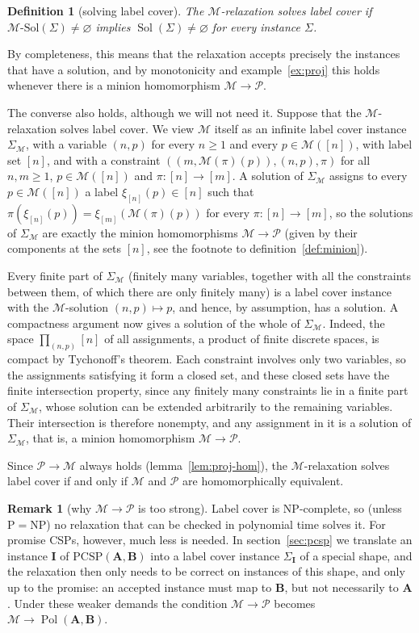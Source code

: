 \documentclass[11pt]{article}
\theoremstyle{plain}
\newtheorem{definition}[theorem]{Definition}
\theoremstyle{definition}
\newtheorem{remark}[theorem]{Remark}
\newcommand{\Pol}{\operatorname{Pol}}
\newcommand{\Sol}{\operatorname{Sol}}
\newcommand{\Solm}[1]{#1\text{-}\mathrm{Sol}}
\newcommand{\bA}{\mathbf{A}}
\newcommand{\bB}{\mathbf{B}}
\newcommand{\bI}{\mathbf{I}}
\newcommand{\Pm}{\mathscr{P}}
\newcommand{\M}{\mathscr{M}}
\newcommand{\PCSP}{\mathrm{PCSP}}
\begin{document}
\begin{definition}[solving label cover]
The $\M$-relaxation \emph{solves} label cover if $\Solm{\M}(\Sigma)\neq\varnothing$ implies $\Sol(\Sigma)\neq\varnothing$ for every instance $\Sigma$.
\end{definition}

By completeness, this means that the relaxation accepts precisely the instances that have a solution, and by monotonicity and example~\ref{ex:proj} this holds whenever there is a minion homomorphism $\M\to\Pm$.

The converse also holds, although we will not need it. Suppose that the $\M$-relaxation solves label cover. We view $\M$ itself as an infinite label cover instance $\Sigma_\M$, with a variable $(n,p)$ for every $n\geq1$ and every $p\in\M([n])$, with label set $[n]$, and with a constraint $((m,\M(\pi)(p)),(n,p),\pi)$ for all $n,m\geq1$, $p\in\M([n])$ and $\pi\colon[n]\to[m]$. A solution of $\Sigma_\M$ assigns to every $p\in\M([n])$ a label $\xi_{[n]}(p)\in[n]$ such that $\pi(\xi_{[n]}(p))=\xi_{[m]}(\M(\pi)(p))$ for every $\pi\colon[n]\to[m]$, so the solutions of $\Sigma_\M$ are exactly the minion homomorphisms $\M\to\Pm$ (given by their components at the sets $[n]$, see the footnote to definition~\ref{def:minion}).

Every finite part of $\Sigma_\M$ (finitely many variables, together with all the constraints between them, of which there are only finitely many) is a label cover instance with the $\M$-solution $(n,p)\mapsto p$, and hence, by assumption, has a solution. A compactness argument now gives a solution of the whole of $\Sigma_\M$. Indeed, the space $\prod_{(n,p)}[n]$ of all assignments, a product of finite discrete spaces, is compact by Tychonoff's theorem. Each constraint involves only two variables, so the assignments satisfying it form a closed set, and these closed sets have the finite intersection property, since any finitely many constraints lie in a finite part of $\Sigma_\M$, whose solution can be extended arbitrarily to the remaining variables. Their intersection is therefore nonempty, and any assignment in it is a solution of $\Sigma_\M$, that is, a minion homomorphism $\M\to\Pm$.

Since $\Pm\to\M$ always holds (lemma~\ref{lem:proj-hom}), the $\M$-relaxation solves label cover if and only if $\M$ and $\Pm$ are homomorphically equivalent.

\begin{remark}[why $\M\to\Pm$ is too strong]\label{rem:too-strong}
Label cover is NP-complete, so (unless $\mathrm P=\mathrm{NP}$) no relaxation that can be checked in polynomial time solves it. For promise CSPs, however, much less is needed. In section~\ref{sec:pcsp} we translate an instance $\bI$ of $\PCSP(\bA,\bB)$ into a label cover instance $\Sigma_{\bI}$ of a special shape, and the relaxation then only needs to be correct on instances of this shape, and only up to the promise: an accepted instance must map to $\bB$, but not necessarily to $\bA$. Under these weaker demands the condition $\M\to\Pm$ becomes $\M\to\Pol(\bA,\bB)$.
\end{remark}
\end{document}

